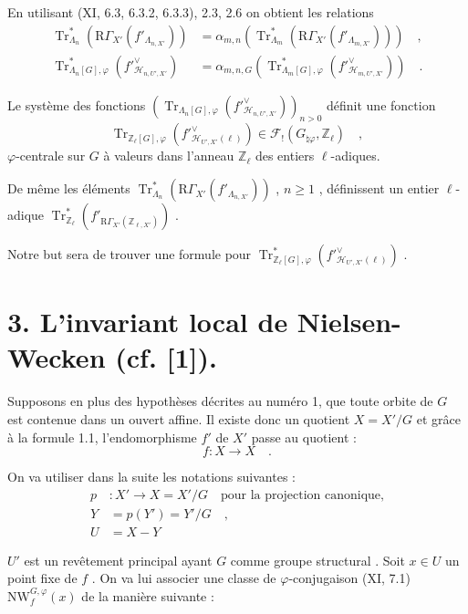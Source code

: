 \documentclass[11pt]{article}
\newcommand{\R}{\mathrm{R}}\newcommand{\RHomCore}{\mathrm{RHom}}
\providecommand{\Tr}{\operatorname{Tr}}
\providecommand{\Tr}{\operatorname{Tr}}
\providecommand{\Tr}{\operatorname{Tr}}
\providecommand{\R}{\mathrm R}
\providecommand{\Tr}{\operatorname{Tr}}
\providecommand{\La}{\Lambda}
\providecommand{\bZ}{\mathbb Z}
\providecommand{\Tr}{\operatorname{Tr}}
\begin{document}
En utilisant (XI, 6.3, 6.3.2, 6.3.3), 2.3, 2.6 on obtient les relations
\begin{align}
\tag{2.7} \Tr^*_{\La_n}(\R\Gamma_{X'}(f'_{\La_{n,X'}})) &= \alpha_{m,n}(\Tr^*_{\La_m}(\R\Gamma_{X'}(f'_{\La_{m,X'}}))) \quad , \\
\tag{2.8} \Tr^*_{\La_n[G],\varphi}(f'^\vee_{\mathcal{H}_{n,U',X'}}) &= \alpha_{m,n,G}(\Tr^*_{\La_m[G],\varphi}(f'^\vee_{\mathcal{H}_{m,U',X'}})) \quad .
\end{align}

Le système des fonctions $(\Tr_{\La_n[G],\varphi}(f'^\vee_{\mathcal{H}_{n,U',X'}}))_{n>0}$ définit une fonction
\[
\Tr_{\bZ_\ell[G],\varphi}(f'^\vee_{\mathcal{H}_{U',X'}(\ell)}) \in \mathcal{F}_!(G_{\natural\varphi}, \bZ_\ell) \quad ,
\]
$\varphi$-centrale sur $G$ à valeurs dans l'anneau $\bZ_\ell$ des entiers $\ell$-adiques.

De même les éléments $\Tr^*_{\La_n}(\R\Gamma_{X'}(f'_{\La_{n,X'}}))$ , $n \geq 1$ , définissent un entier $\ell$-adique $\Tr^*_{\bZ_\ell}(f'_{\R\Gamma_{X'}(\bZ_{\ell,X'})})$ .

Notre but sera de trouver une formule pour $\Tr^*_{\bZ_\ell[G],\varphi}(f'^\vee_{\mathcal{H}_{U',X'}(\ell)})$ .


\section*{3. L'invariant local de Nielsen-Wecken (cf. [1]).}
Supposons en plus des hypothèses décrites au numéro 1, que toute orbite de $G$ est contenue dans un ouvert affine. Il existe donc un quotient $X = X'/G$ et grâce à la formule 1.1, l'endomorphisme $f'$ de $X'$ passe au quotient :
\[
f : X \longrightarrow X \quad .
\]

On va utiliser dans la suite les notations suivantes :
\begin{align*}
p &: X' \longrightarrow X = X'/G \quad
\text{pour la projection canonique,} \\
Y &= p(Y') = Y'/G \quad , \\
U &= X - Y
\end{align*}

$U'$ est un revêtement principal ayant $G$ comme groupe structural . Soit $x \in U$ un point fixe de $f$ . On va lui associer une classe de $\varphi$-conjugaison (XI, 7.1) $\mathrm{NW}_{f}^{G,\varphi}(x)$ de la manière suivante :
\end{document}

